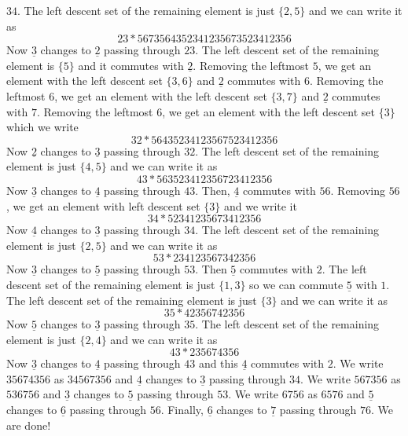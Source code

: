 \documentclass[a4paper]{amsart}
\begin{document}
$34$. The left descent set of
the remaining element is just $\{2,5\}$ and we can write it as 
\begin{displaymath}
23 *  5673564352341235673523412356
\end{displaymath}
Now $\underline{{3}}$ changes to
$\underline{2}$ passing through $23$.  The left descent set of
the remaining element is $\{5\}$ and it commutes with 
$\underline{2}$. Removing the leftmost $5$, we get an element 
with the left descent set $\{3,6\}$ and $\underline{2}$ commutes
with $6$. Removing the leftmost $6$, we get an element 
with the left descent set $\{3,7\}$ and $\underline{2}$ commutes
with $7$. Removing the leftmost $6$, we get an element 
with the left descent set $\{3\}$ which we write
\begin{displaymath}
32 * 56435234123567523412356
\end{displaymath}
Now $\underline{{2}}$ changes to
$\underline{3}$ passing through $32$. 
The left descent set of
the remaining element is just $\{4,5\}$ and we can write it as 
\begin{displaymath}
43 *  563523412356723412356
\end{displaymath}
Now $\underline{{3}}$ changes to
$\underline{4}$ passing through $43$.
Then, $\underline{4}$ commutes with $56$.
Removing $56$, we get an element with 
left descent set $\{3\}$ and we write it
\begin{displaymath}
34 *  52341235673412356
\end{displaymath}
Now $\underline{{4}}$ changes to
$\underline{3}$ passing through $34$.
The left descent set of
the remaining element is just $\{2,5\}$ and we can write it as 
\begin{displaymath}
53 *  234123567342356
\end{displaymath}
Now $\underline{{3}}$ changes to
$\underline{5}$ passing through $53$.
Then $\underline{5}$ commutes with $2$. 
The left descent set of
the remaining element is just $\{1,3\}$
so we can commute $\underline{5}$ with $1$.
The left descent set of
the remaining element is just $\{3\}$ and we can write it as 
\begin{displaymath}
35 *  42356742356
\end{displaymath}
Now $\underline{{5}}$ changes to
$\underline{3}$ passing through $35$.
The left descent set of
the remaining element is just $\{2,4\}$ and we can write it as 
\begin{displaymath}
43 *  235674356
\end{displaymath}
Now $\underline{{3}}$ changes to
$\underline{4}$ passing through $43$
and this $\underline{4}$ commutes with $2$.
We write  $35674356$ as $34567356$ and 
$\underline{{4}}$ changes to
$\underline{3}$ passing through $34$.
We write $567356$  as $536756$ and 
$\underline{{3}}$ changes to
$\underline{5}$ passing through $53$.
We write $6756$  as $6576$ and 
$\underline{{5}}$ changes to
$\underline{6}$ passing through $56$.
Finally, $\underline{{6}}$ changes to
$\underline{7}$ passing through $76$.
We are done!
\end{document}
